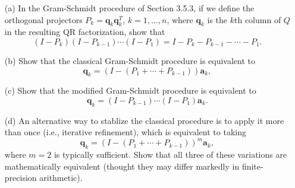 \begin{pro}
  \begin{itemize}
  \item[(a)]
    In the Gram-Schmidt procedure of Section 3.5.3,
    if we define the orthogonal projectors $P_k = \mathbf{q}_k\mathbf{q}_k^T$,
    $k=1, \ldots, n$, where $\mathbf{q}_k$ is the $k$th column of $Q$ in the
    resulting QR factorization, show that
    \begin{displaymath}
      (I-P_k)(I-P_{k-1})\cdots(I-P_1) = I-P_k-P_{k-1}-\cdots-P_1.
    \end{displaymath}

  \item[(b)]
    Show that the classical Gram-Schmidt procedure is equivalent to
    \begin{displaymath}
      \mathbf{q}_k = (I-(P_1+\cdots+P_{k-1}))\mathbf{a}_k,
    \end{displaymath}

  \item[(c)]
    Show that the modified Gram-Schmidt procedure is equivalent to
    \begin{displaymath}
      \mathbf{q}_k = (I-P_{k-1})\cdots(I-P_1)\mathbf{a}_k.
    \end{displaymath}

  \item[(d)]
    An alternative way to stablize the classical procedure is to apply it more
    than once (i.e., iterative refinement),
    which is equivalent to taking
    \begin{displaymath}
      \mathbf{q}_k = (I-(P_1+\cdots+P_{k-1}))^m\mathbf{a}_k,
    \end{displaymath}
    where $m=2$ is typically sufficient.
    Show that all three of these variations are mathematically equivalent
    (thought they may differ markedly in finite-precision arithmetic).
  \end{itemize}
\end{pro}

